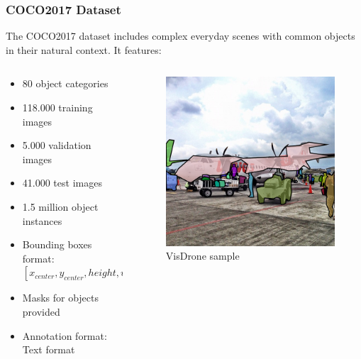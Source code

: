 \documentclass{beamer}
\begin{document}
\begin{frame}[t]
  \frametitle{COCO2017 Dataset}
  The COCO2017 dataset includes complex everyday scenes with common objects in their natural context. It features:
  \begin{columns}
    \begin{column}{0.5\textwidth}
      \begin{itemize}
        \item 80 object categories
        \item 118.000 training images
        \item 5.000 validation images
        \item 41.000 test images 
        \item 1.5 million object instances
        \item Bounding boxes format: $[x_{center}, y_{center}, height, width]$
        \item Masks for objects provided
        \item Annotation format: Text format
      \end{itemize}
    \end{column}

    \begin{column}{0.5\textwidth}
      \centering
      \begin{figure}
        \includegraphics[scale=0.2]{Figures/coco-example.png}
        \caption{VisDrone sample}
        \label{fig:coco-ex}
      \end{figure}
    \end{column}
  \end{columns}

\end{frame}
\end{document}
